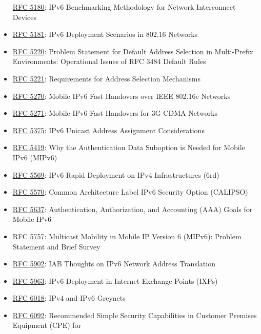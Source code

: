 \documentclass[
]{article}
\begin{document}
\begin{itemize}
  \href{https://www.rfc-editor.org/info/rfc5180}{RFC 5180}: IPv6
  Benchmarking Methodology for Network Interconnect Devices
\item
  \href{https://www.rfc-editor.org/info/rfc5181}{RFC 5181}: IPv6
  Deployment Scenarios in 802.16 Networks
\item
  \href{https://www.rfc-editor.org/info/rfc5220}{RFC 5220}: Problem
  Statement for Default Address Selection in Multi-Prefix Environments:
  Operational Issues of RFC 3484 Default Rules
\item
  \href{https://www.rfc-editor.org/info/rfc5221}{RFC 5221}: Requirements
  for Address Selection Mechanisms
\item
  \href{https://www.rfc-editor.org/info/rfc5270}{RFC 5270}: Mobile IPv6
  Fast Handovers over IEEE 802.16e Networks
\item
  \href{https://www.rfc-editor.org/info/rfc5271}{RFC 5271}: Mobile IPv6
  Fast Handovers for 3G CDMA Networks
\item
  \href{https://www.rfc-editor.org/info/rfc5375}{RFC 5375}: IPv6 Unicast
  Address Assignment Considerations
\item
  \href{https://www.rfc-editor.org/info/rfc5419}{RFC 5419}: Why the
  Authentication Data Suboption is Needed for Mobile IPv6 (MIPv6)
\item
  \href{https://www.rfc-editor.org/info/rfc5569}{RFC 5569}: IPv6 Rapid
  Deployment on IPv4 Infrastructures (6rd)
\item
  \href{https://www.rfc-editor.org/info/rfc5570}{RFC 5570}: Common
  Architecture Label IPv6 Security Option (CALIPSO)
\item
  \href{https://www.rfc-editor.org/info/rfc5637}{RFC 5637}:
  Authentication, Authorization, and Accounting (AAA) Goals for Mobile
  IPv6
\item
  \href{https://www.rfc-editor.org/info/rfc5757}{RFC 5757}: Multicast
  Mobility in Mobile IP Version 6 (MIPv6): Problem Statement and Brief
  Survey
\item
  \href{https://www.rfc-editor.org/info/rfc5902}{RFC 5902}: IAB Thoughts
  on IPv6 Network Address Translation
\item
  \href{https://www.rfc-editor.org/info/rfc5963}{RFC 5963}: IPv6
  Deployment in Internet Exchange Points (IXPs)
\item
  \href{https://www.rfc-editor.org/info/rfc6018}{RFC 6018}: IPv4 and
  IPv6 Greynets
\item
  \href{https://www.rfc-editor.org/info/rfc6092}{RFC 6092}: Recommended
  Simple Security Capabilities in Customer Premises Equipment (CPE) for

\end{itemize}
\end{document}
